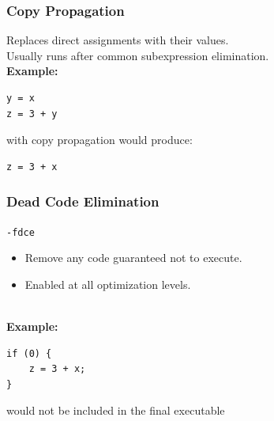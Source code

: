 \begin{frame}[fragile]
  \frametitle{Copy Propagation}

  
  Replaces direct assignments with their values. \\
  Usually runs after
  common subexpression elimination.\\[1em]

  {\bf Example:}
  \begin{lstlisting}
y = x
z = 3 + y
  \end{lstlisting}

  with copy propagation would produce:

  \begin{lstlisting}
z = 3 + x
  \end{lstlisting}
  
\end{frame}

\begin{frame}[fragile]
  \frametitle{Dead Code Elimination}

  
  {\tt -fdce}

  \begin{itemize}
    \item Remove any code guaranteed not to execute.
    \item Enabled at all optimization levels.
  \end{itemize}
~\\

  {\bf Example:}
  \begin{lstlisting}
if (0) {
    z = 3 + x;
}
  \end{lstlisting}
  would not be included in the final executable
  
\end{frame}

